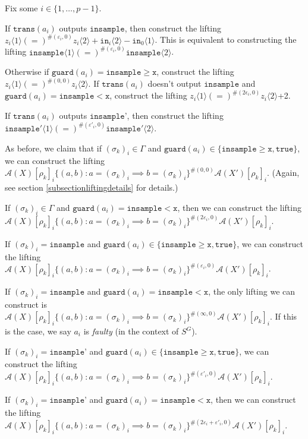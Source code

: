 \documentclass[12pt]{article}
\newcommand{\gguard}[1][x]{\texttt{insample}\geq \texttt{#1}}
\newcommand{\lguard}[1][x]{\texttt{insample} < \texttt{#1}}
\newcommand{\brangle}[1]{\langle #1 \rangle}
\newcommand{\guard}{\texttt{guard}}
\newcommand{\trans}{\texttt{trans}}
\theoremstyle{definition}
\begin{document}
Fix some $i\in\{1, \ldots, p-1\}$. 

If $\trans(a_i)$ outputs $\texttt{insample}$, then construct the lifting $z_i\brangle{1} (=)^{\#(\varepsilon_i, 0)}z_i\brangle{2} + \texttt{in}_i\brangle{2}-\texttt{in}_0\brangle{1}$. This is equivalent to constructing the lifting $\texttt{insample}\brangle{1} (=)^{\#(\varepsilon_i, 0)}\texttt{insample}\brangle{2}$.

Otherwise if $\guard(a_i) = \gguard$, construct the lifting $z_i\brangle{1} (=)^{\#(0, 0)}z_i\brangle{2}$. If $\trans(a_i)$ doesn't output $\texttt{insample}$ and $\guard(a_i) = \lguard$, construct the lifting $z_i\brangle{1} (=)^{\#(2\epsilon_i, 0)}z_i\brangle{2}$+2. 

If $\trans(a_i)$ outputs $\texttt{insample'}$, then construct the lifting $\texttt{insample}'\brangle{1} (=)^{\#(\varepsilon'_i, 0)} \texttt{insample}'\brangle{2}$.

As before, we claim that if $(\sigma_k)_i \in \Gamma$ and $\guard(a_i) \in \{\gguard, \texttt{true}\}$, we can construct the lifting $\mathcal{A}(X)[\rho_k]_i\{(a, b): a = (\sigma_k)_i \implies b = (\sigma_k)_i\}^{\#(0, 0)}\mathcal{A}(X')[\rho_k]_i$. (Again, see section \ref{subsectionliftingdetails} for details.)

If $(\sigma_k)_i \in \Gamma$ and $\guard(a_i) = \lguard$, then we can construct the lifting $\mathcal{A}(X)[\rho_k]_i\{(a, b): a = (\sigma_k)_i \implies b = (\sigma_k)_i\}^{\#(2\varepsilon_i, 0)}\mathcal{A}(X')[\rho_k]_i$.

If $(\sigma_k)_i = \texttt{insample}$ and $\guard(a_i) \in \{\gguard, \texttt{true}\}$, we can construct the lifting $\mathcal{A}(X)[\rho_k]_i\{(a, b): a = (\sigma_k)_i \implies b = (\sigma_k)_i\}^{\#(\varepsilon_i, 0)}\mathcal{A}(X')[\rho_k]_i$.

If $(\sigma_k)_i = \texttt{insample}$ and $\guard(a_i) = \lguard$, the only lifting we can construct is $\mathcal{A}(X)[\rho_k]_i\{(a, b): a = (\sigma_k)_i \implies b = (\sigma_k)_i\}^{\#(\infty, 0)}\mathcal{A}(X')[\rho_k]_i$. If this is the case, we say $a_i$ is \textit{faulty} (in the context of $S^G$).

If $(\sigma_k)_i =\texttt{insample'}$ and $\guard(a_i) \in \{\gguard, \texttt{true}\}$, we can construct the lifting $\mathcal{A}(X)[\rho_k]_i\{(a, b): a = (\sigma_k)_i \implies b = (\sigma_k)_i\}^{\#(\varepsilon'_i, 0)}\mathcal{A}(X')[\rho_k]_i$.

If $(\sigma_k)_i =\texttt{insample'}$ and $\guard(a_i) = \lguard$, then we can construct the lifting $\mathcal{A}(X)[\rho_k]_i\{(a, b): a = (\sigma_k)_i \implies b = (\sigma_k)_i\}^{\#(2\varepsilon_i+\varepsilon'_i, 0)}\mathcal{A}(X')[\rho_k]_i$.
\end{document}
